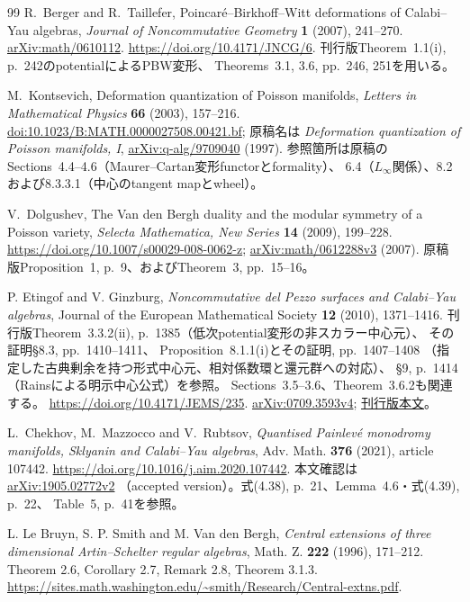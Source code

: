\begin{thebibliography}{99}
R.~Berger and R.~Taillefer,
Poincar\'e--Birkhoff--Witt deformations of Calabi--Yau algebras,
\emph{Journal of Noncommutative Geometry} \textbf{1} (2007), 241--270.
\href{https://arxiv.org/abs/math/0610112}{arXiv:math/0610112}.
\url{https://doi.org/10.4171/JNCG/6}.
刊行版Theorem~1.1(i), p.~242のpotentialによるPBW変形、
Theorems~3.1, 3.6, pp.~246, 251を用いる。

M.~Kontsevich,
Deformation quantization of Poisson manifolds,
\emph{Letters in Mathematical Physics} \textbf{66} (2003), 157--216.
\href{https://doi.org/10.1023/B:MATH.0000027508.00421.bf}{doi:10.1023/B:MATH.0000027508.00421.bf};
原稿名は \emph{Deformation quantization of Poisson manifolds, I},
\href{https://arxiv.org/abs/q-alg/9709040}{arXiv:q-alg/9709040} (1997).
参照箇所は原稿のSections~4.4--4.6（Maurer--Cartan変形functorとformality）、
6.4（$L_\infty$関係）、8.2および8.3.3.1（中心のtangent mapとwheel）。

V.~Dolgushev,
The Van den Bergh duality and the modular symmetry of a Poisson variety,
\emph{Selecta Mathematica, New Series} \textbf{14} (2009), 199--228.
\url{https://doi.org/10.1007/s00029-008-0062-z};
\href{https://arxiv.org/abs/math/0612288v3}{arXiv:math/0612288v3} (2007).
原稿版Proposition~1, p.~9、およびTheorem~3, pp.~15--16。

P. Etingof and V. Ginzburg,
\emph{Noncommutative del Pezzo surfaces and Calabi--Yau algebras},
Journal of the European Mathematical Society \textbf{12} (2010), 1371--1416.
刊行版Theorem~3.3.2(ii), p.~1385（低次potential変形の非スカラー中心元）、
その証明\S8.3, pp.~1410--1411、
Proposition~8.1.1(i)とその証明, pp.~1407--1408
（指定した古典剰余を持つ形式中心元、相対係数環と還元群への対応）、
\S9, p.~1414（Rainsによる明示中心公式）を参照。
Sections~3.5--3.6、Theorem~3.6.2も関連する。
\url{https://doi.org/10.4171/JEMS/235}.
\href{https://arxiv.org/abs/0709.3593v4}{arXiv:0709.3593v4};
\href{https://ems.press/content/serial-article-files/31746}{刊行版本文}。

L.~Chekhov, M.~Mazzocco and V.~Rubtsov,
\emph{Quantised Painlev\'e monodromy manifolds, Sklyanin and Calabi--Yau algebras},
Adv. Math. \textbf{376} (2021), article 107442.
\url{https://doi.org/10.1016/j.aim.2020.107442}.
本文確認は\href{https://arxiv.org/abs/1905.02772v2}{arXiv:1905.02772v2}
（accepted version）。式(4.38), p.~21、Lemma~4.6・式(4.39), p.~22、
Table~5, p.~41を参照。

 L. Le Bruyn, S. P. Smith and M. Van den Bergh,
\emph{Central extensions of three dimensional Artin--Schelter regular algebras},
Math. Z. \textbf{222} (1996), 171--212.
Theorem 2.6, Corollary 2.7, Remark 2.8, Theorem 3.1.3.
\url{https://sites.math.washington.edu/~smith/Research/Central-extns.pdf}.


\end{thebibliography}
